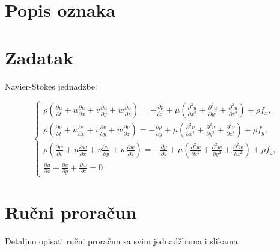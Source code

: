 \documentclass[a4paper,12pt]{article}
\begin{document}
\newpage
\listoftables
{}

\newpage
\section*{Popis oznaka}

\newpage
{}

\section{Zadatak}
Navier-Stokes jednadžbe:

\begin{equation}
\begin{cases}
\rho \left( \frac{\partial u}{\partial t} + u \frac{\partial u}{\partial x} + v \frac{\partial u}{\partial y} + w \frac{\partial u}{\partial z} \right) = - \frac{\partial p}{\partial x} + \mu \left( \frac{\partial^2 u}{\partial x^2} + \frac{\partial^2 u}{\partial y^2} + \frac{\partial^2 u}{\partial z^2} \right) + \rho f_x, \\[1em]
\rho \left( \frac{\partial v}{\partial t} + u \frac{\partial v}{\partial x} + v \frac{\partial v}{\partial y} + w \frac{\partial v}{\partial z} \right) = - \frac{\partial p}{\partial y} + \mu \left( \frac{\partial^2 v}{\partial x^2} + \frac{\partial^2 v}{\partial y^2} + \frac{\partial^2 v}{\partial z^2} \right) + \rho f_y, \\[1em]
\rho \left( \frac{\partial w}{\partial t} + u \frac{\partial w}{\partial x} + v \frac{\partial w}{\partial y} + w \frac{\partial w}{\partial z} \right) = - \frac{\partial p}{\partial z} + \mu \left( \frac{\partial^2 w}{\partial x^2} + \frac{\partial^2 w}{\partial y^2} + \frac{\partial^2 w}{\partial z^2} \right) + \rho f_z, \\[0.5em]
\frac{\partial u}{\partial x} + \frac{\partial v}{\partial y} + \frac{\partial w}{\partial z} = 0
\end{cases}
\end{equation}


\section{Ručni proračun}
Detaljno opisati ručni proračun sa svim jednadžbama i slikama:
\end{document}
